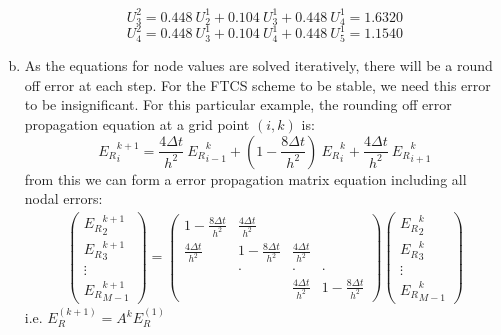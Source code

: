 \documentclass[fleqn]{article}
\begin{document}
\begin{enumerate}[a)]
\[U_3^2 = 0.448\ U_2^1+0.104\ U_3^1+0.448\ U_4^1 = 1.6320\]
\[U_4^2 = 0.448\ U_3^1+0.104\ U_4^1+0.448\ U_5^1 = 1.1540\]
\item As the equations for node values are solved iteratively, there will be a round off error at each step. For the FTCS scheme to be stable, we need this error to be insignificant. For this particular example, the rounding off error propagation equation at a grid point $(i,k)$ is:
\[{E_R}_i^{k+1} =\frac{4\Delta t}{h^2}\ {E_R}_{i-1}^k+\left(1-\frac{8\Delta t}{h^2}\right)\ {E_R}_i^k+\frac{4\Delta t}{h^2}\ {E_R}_{i+1}^k\]
from this we can form a error propagation matrix equation including all nodal errors:
\begin{gather}
\begin{pmatrix}
{E_R}_2^{k+1}\\
{E_R}_3^{k+1}\\
\vdots\\
{E_R}_{M-1}^{k+1}
\end{pmatrix}
=
\begin{pmatrix}
1-\frac{8\Delta t}{h^2} & \frac{4\Delta t}{h^2} & \ & \ \\
\frac{4\Delta t}{h^2}& 1-\frac{8\Delta t}{h^2}&\frac{4\Delta t}{h^2}& \ \\
\ & \cdot & \cdot & \cdot\\
\ & \ & \frac{4\Delta t}{h^2} &1-\frac{8\Delta t}{h^2}
\end{pmatrix}
\begin{pmatrix}
{E_R}_2^{k}\\
{E_R}_3^{k}\\
\vdots\\
{E_R}_{M-1}^{k}
\end{pmatrix}
\end{gather}
i.e. \(E_R^{(k+1)} = A^kE_R^{(1)}\)
\end{enumerate}
\end{document}
